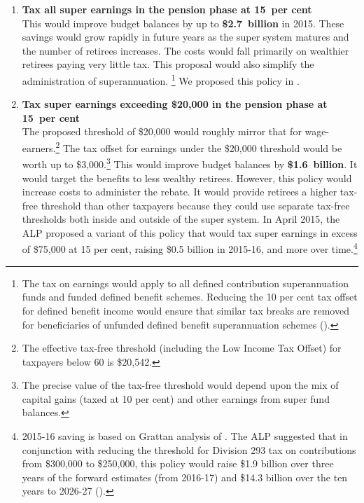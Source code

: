 \begin{enumerate}
\item \textbf{Tax all super earnings in the pension phase at 15~per cent}\\  
This would improve budget balances by up to \textbf{\$2.7~billion} in 2015. These savings would grow rapidly in future years as the super system matures and the number of retirees increases. The costs would fall primarily on wealthier retirees paying very little tax. This proposal would also simplify the administration of superannuation.%
\footnote{The tax on earnings would apply to all defined contribution superannuation funds and funded defined benefit schemes. Reducing the 10 per cent tax offset for defined benefit income would ensure that similar tax breaks are removed for beneficiaries of unfunded defined benefit superannuation schemes (\textcite{ALP2015FairerSuper}).}  We proposed this policy in . 
%
\item \textbf{Tax super earnings exceeding \$20,000 in the pension phase at 15~per cent}\\ 
The proposed threshold of \$20,000 would roughly mirror that for wage-earners.\footnote{The effective tax-free threshold (including the Low Income Tax Offset) for taxpayers below 60 is \$20,542.}  The tax offset for earnings under the \$20,000 threshold would be worth up to \$3,000.\footnote{The precise value of the tax-free threshold would depend upon the mix of capital gains (taxed at 10 per cent) and other earnings from super fund balances.}  This would improve budget balances by \textbf{\$1.6~billion}. It would target the benefits to less wealthy retirees. However, this policy would increase costs to administer the rebate. It would provide retirees a higher tax-free threshold than other taxpayers because they could use separate tax-free thresholds both inside and outside of the super system. In April 2015, the ALP proposed a variant of this policy that would tax super earnings in excess of \$75,000 at 15 per cent, raising \$0.5 billion in 2015-16, and more over time.\footnote{2015-16 saving is based on Grattan analysis of \textcite{ABS2013t}. The ALP suggested that in conjunction with reducing the threshold for Division 293 tax on contributions from \$300,000 to \$250,000, this policy would raise \$1.9 billion over three years of the forward estimates (from 2016-17) and \$14.3 billion over the ten years to 2026-27 (\textcite{ALP2015FairerSuper}).}

\end{enumerate}
